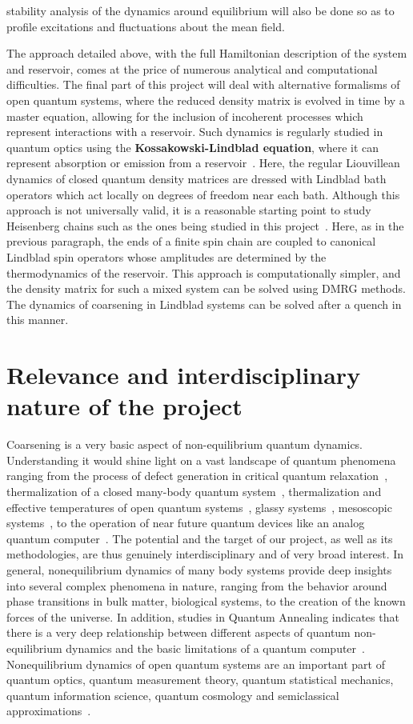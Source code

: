 \documentclass[a4paper,9pt]{article}
\begin{document}
stability analysis of the dynamics around equilibrium will also be done so as to profile excitations and fluctuations about the mean field.

The approach detailed above, with the full Hamiltonian description of the system and reservoir, comes at the price of numerous analytical and computational difficulties. The final part of this project will deal with alternative formalisms of open quantum systems, where the reduced density matrix is evolved in time by a master equation, allowing for the inclusion of incoherent processes which represent interactions with a reservoir. Such dynamics is regularly studied in quantum optics using the \textbf{Kossakowski-Lindblad equation}, where it can represent absorption or emission from a reservoir~\cite{lindblad}. Here, the regular Liouvillean dynamics of closed quantum density matrices are dressed with Lindblad bath operators which act locally on degrees of freedom near each bath. Although this approach is not universally valid, it is a reasonable starting point to study Heisenberg chains such as the ones being studied in this project~\cite{spinchains:lindblad}. Here, as in the previous paragraph, the ends of 
a finite spin chain are coupled to canonical Lindblad spin operators whose amplitudes are determined by the thermodynamics of the reservoir.  This approach is computationally simpler, and the density matrix for such a mixed system can be solved using DMRG methods. The dynamics of coarsening in Lindblad systems can be solved after a quench in this manner.

 
\section{Relevance and interdisciplinary nature of the project}
\label{sec:timeliness}

Coarsening is a very basic aspect of non-equilibrium quantum dynamics. Understanding it would shine light on a vast landscape of quantum phenomena ranging from the process of defect generation in critical quantum relaxation~\cite{relaxation}, thermalization of a closed many-body quantum system~\cite{krishrev, thermalization}, thermalization and effective temperatures of open quantum systems~\cite{thermopen}, glassy systems~\cite{glassy}, mesoscopic systems~\cite{meso}, to the operation of near future quantum devices like an analog quantum computer~\cite{annealing}. The potential and the target of our project, as well as its methodologies, are thus genuinely interdisciplinary and of very broad interest. In general, nonequilibrium dynamics of many body systems provide deep insights into several complex phenomena in nature, ranging from the behavior around phase transitions in bulk matter, biological systems,  to the creation of the known forces of the universe. In addition, studies in Quantum Annealing indicates that there is a very deep relationship between different aspects of quantum non-equilibrium dynamics and the basic limitations of a quantum computer~\cite{annealing}. Nonequilibrium dynamics of open quantum systems are an important part of quantum optics, quantum measurement theory, quantum statistical mechanics, quantum information science, quantum cosmology and semiclassical approximations~\cite{openq}. 
\end{document}
